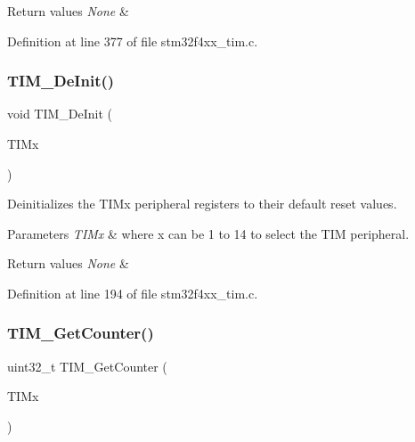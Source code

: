 \begin{DoxyRetVals}{Return values}
{\em None} & \\
\hline
\end{DoxyRetVals}


Definition at line 377 of file stm32f4xx\+\_\+tim.\+c.

\mbox{\label{group___t_i_m___group1_ga1659cc0ce503ac151568e0c7c02b1ba5}} 
\subsubsection{\texorpdfstring{T\+I\+M\+\_\+\+De\+Init()}{TIM\_DeInit()}}
{\footnotesize\ttfamily void T\+I\+M\+\_\+\+De\+Init (\begin{DoxyParamCaption}\item[{\hyperlink{struct_t_i_m___type_def}{T\+I\+M\+\_\+\+Type\+Def} $\ast$}]{T\+I\+Mx }\end{DoxyParamCaption})}



Deinitializes the T\+I\+Mx peripheral registers to their default reset values. 


\begin{DoxyParams}{Parameters}
{\em T\+I\+Mx} & where x can be 1 to 14 to select the T\+IM peripheral. \\
\hline
\end{DoxyParams}

\begin{DoxyRetVals}{Return values}
{\em None} & \\
\hline
\end{DoxyRetVals}


Definition at line 194 of file stm32f4xx\+\_\+tim.\+c.

\mbox{\label{group___t_i_m___group1_ga53607976e0866ab424e294cda9f6036e}} 
\subsubsection{\texorpdfstring{T\+I\+M\+\_\+\+Get\+Counter()}{TIM\_GetCounter()}}
{\footnotesize\ttfamily uint32\+\_\+t T\+I\+M\+\_\+\+Get\+Counter (\begin{DoxyParamCaption}\item[{\hyperlink{struct_t_i_m___type_def}{T\+I\+M\+\_\+\+Type\+Def} $\ast$}]{T\+I\+Mx }\end{DoxyParamCaption})}



